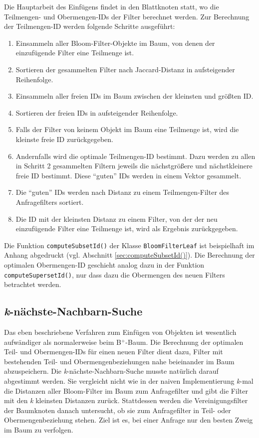 Die Hauptarbeit des Einfügens findet in den Blattknoten statt, wo die Teilmengen- und Obermengen-IDs der Filter berechnet werden. Zur Berechnung der Teil\-mengen-ID werden folgende Schritte ausgeführt: 
\begin{enumerate}
	\item Einsammeln aller Bloom-Filter-Objekte im Baum, von denen der einzufügende Filter eine Teilmenge ist.
	\item Sortieren der gesammelten Filter nach Jaccard-Distanz in aufsteigender Reihenfolge.
	\item Einsammeln aller freien IDs im Baum zwischen der kleinsten und größten ID. 
	\item Sortieren der freien IDs in aufsteigender Reihenfolge.
	\item Falls der Filter von keinem Objekt im Baum eine Teilmenge ist, wird die kleinste freie ID zurückgegeben. 
	\item Andernfalls wird die optimale Teilmengen-ID bestimmt. Dazu werden zu allen in Schritt 2 gesammelten Filtern jeweils die nächstgrößere und nächstkleinere freie ID bestimmt. Diese "`guten"' IDs werden in einem Vektor gesammelt. 
	\item Die "`guten"' IDs werden nach Distanz zu einem Teilmengen-Filter des Anfragefilters sortiert. 
	\item Die ID mit der kleinsten Distanz zu einem Filter, von der der neu einzufügende Filter eine Teilmenge ist, wird als Ergebnis zurückgegeben. 
\end{enumerate}
Die Funktion \texttt{computeSubsetId()} der Klasse \texttt{BloomFilterLeaf} ist beispielhaft im Anhang abgedruckt (vgl. Abschnitt \ref{sec:computeSubsetId()}). Die Berechnung der optimalen Obermengen-ID geschieht analog dazu in der Funktion \texttt{computeSupersetId()}, nur dass dazu die Obermengen des neuen Filters betrachtet werden. 
\subsection{\textit{k}-nächste-Nachbarn-Suche}\label{sec:knn}
Das eben beschriebene Verfahren zum Einfügen von Objekten ist wesentlich aufwändiger als normalerweise beim B$^+$-Baum. Die Berechnung der optimalen Teil- und Obermengen-IDs für einen neuen Filter dient dazu, Filter mit bestehenden Teil- und Obermengenbeziehungen nahe beieinander im Baum abzuspeichern. Die \textit{k}-nächste-Nachbarn-Suche musste natürlich darauf abgestimmt werden. Sie vergleicht nicht wie in der naiven Implementierung \textit{k}-mal die Distanzen aller Bloom-Filter im Baum zum Anfragefilter und gibt die Filter mit den \textit{k} kleinsten Distanzen zurück. Stattdessen werden die Vereinigungsfilter der Baumknoten danach untersucht, ob sie zum Anfragefilter in Teil- oder Obermengenbeziehung stehen. Ziel ist es, bei einer Anfrage nur den besten Zweig im Baum zu verfolgen.

